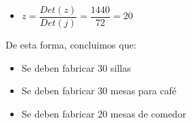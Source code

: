 \documentclass[11pt,a4paper]{article}
\begin{document}
\begin{enumerate}
\begin{itemize}
\item $z = \dfrac{Det(z)}{Det(j)} = \dfrac{1440}{72} = 20 $
\end{itemize}

De esta forma, concluimos que:

\begin{itemize}
\item Se deben fabricar 30 sillas
\end{itemize}

\begin{itemize}
\item Se deben fabricar 30 mesas para café
\end{itemize}

\begin{itemize}
\item Se deben fabricar 20 mesas de comedor
\end{itemize}

































\end{enumerate}
%

\end{document}
